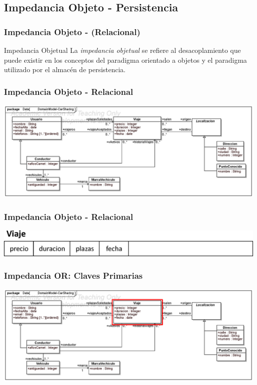 \documentclass[a4paper,slidestop,xcolor=pst,blue]{beamer}
\begin{document}
\subsection{Impedancia Objeto - Persistencia}

\begin{frame}[c]
    \frametitle{Impedancia Objeto - (Relacional)}
    \begin{block}{Impedancia Objetual}
    La \emph{impedancia objetual} se refiere al desacoplamiento que puede existir en los conceptos del paradigma orientado a objetos y el paradigma utilizado por el almacén de persistencia.
    \end{block}
\end{frame}

\begin{frame}[c]
    \frametitle{Impedancia Objeto - Relacional}
    \begin{center}
        \includegraphics[width=\linewidth]{images/ooMismatch/ooMismatch00.eps}
    \end{center}
\end{frame}

\begin{frame}[c]
    \frametitle{Impedancia Objeto - Relacional}
    \begin{center}
        \includegraphics[width=0.8\linewidth]{images/ooMismatch/ooMismatch01.eps}
    \end{center}
\end{frame}

\begin{frame}[c]
    \frametitle{Impedancia OR: Claves Primarias}
    \begin{center}
        \includegraphics[width=\linewidth]{images/ooMismatch/ooMismatch09.eps}
    \end{center}
\end{frame}
\end{document}
